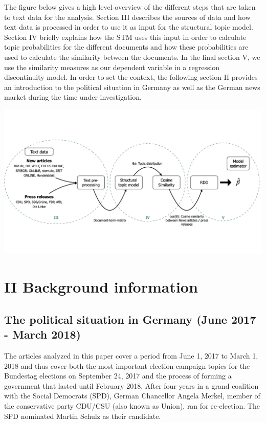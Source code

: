 \documentclass[
]{article}
\begin{document}
The figure below gives a high level overview of the different steps that
are taken to text data for the analysis. Section III describes the
sources of data and how text data is processed in order to use it as
input for the structural topic model. Section IV briefly explains how
the STM uses this input in order to calculate topic probabilities for
the different documents and how these probabilities are used to
calculate the similarity between the documents. In the final section V,
we use the similarity measures as our dependent variable in a regression
discontinuity model. In order to set the context, the following section
II provides an introduction to the political situation in Germany as
well as the German news market during the time under investigation.

\includegraphics{../figs/high_level_overview.png}

\hypertarget{ii-background-information}{%
\section{II Background information}\label{ii-background-information}}

\hypertarget{the-political-situation-in-germany-june-2017---march-2018}{%
\subsection{The political situation in Germany (June 2017 - March
2018)}\label{the-political-situation-in-germany-june-2017---march-2018}}

The articles analyzed in this paper cover a period from June 1, 2017 to
March 1, 2018 and thus cover both the most important election campaign
topics for the Bundestag elections on September 24, 2017 and the process
of forming a government that lasted until February 2018. After four
years in a grand coalition with the Social Democrats (SPD), German
Chancellor Angela Merkel, member of the conservative party CDU/CSU (also
known as Union), ran for re-election. The SPD nominated Martin Schulz as
their candidate.
\end{document}
